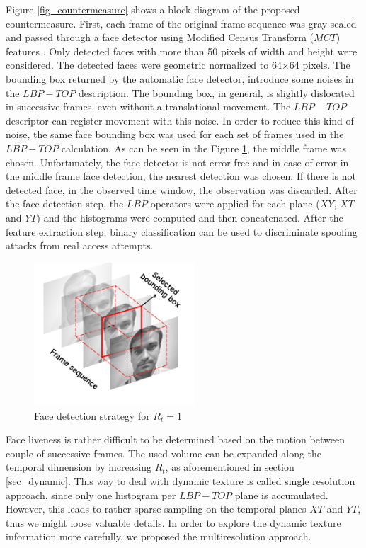 Figure \ref{fig_countermeasure} shows a block diagram of the proposed countermeasure. First, each frame of the original frame sequence was gray-scaled and passed through a face detector using Modified Census Transform ($MCT$) features \cite{froba2004face}. Only detected faces with more than 50 pixels of width and height were considered. The detected faces were geometric normalized to 64$\times$64 pixels. The bounding box returned by the automatic face detector, introduce some noises in the $LBP-TOP$ description. The bounding box, in general, is slightly dislocated in successive frames, even without a translational movement. The $LBP-TOP$ descriptor can register movement with this noise. In order to reduce this kind of noise, the same face bounding box was used for each set of frames used in the $LBP-TOP$ calculation. As can be seen in the Figure \ref{fig_faceDetection}, the middle frame was chosen. Unfortunately, the face detector is not error free and in case of error in the middle frame face detection, the nearest detection was chosen. If there is not detected face, in the observed time window, the observation was discarded. After the face detection step, the $LBP$ operators were applied for each plane ($XY$, $XT$ and $YT$) and the histograms were computed and then concatenated. After the feature extraction step, binary classification can be used to discriminate spoofing attacks from real access attempts.

\begin{figure}[!htb]
\begin{center}
\includegraphics [width=6cm] {images/proposed_countermeasure/faceDetection_2.png}
\caption[Face detection strategy for $R_t = 1$]{Face detection strategy for $R_t = 1$} \label{fig_faceDetection}
\end{center}
\end{figure}

Face liveness is rather difficult to be determined based on the motion between couple of successive frames. The used volume can be expanded along the temporal dimension by increasing $R_t$, as aforementioned in section \ref{sec_dynamic}. This way to deal with dynamic texture is called single resolution approach, since only one histogram per $LBP-TOP$ plane is accumulated. However, this leads to rather sparse sampling on the temporal planes $XT$ and $YT$, thus we might loose valuable details. In order to explore the dynamic texture information more carefully, we proposed the multiresolution approach.

